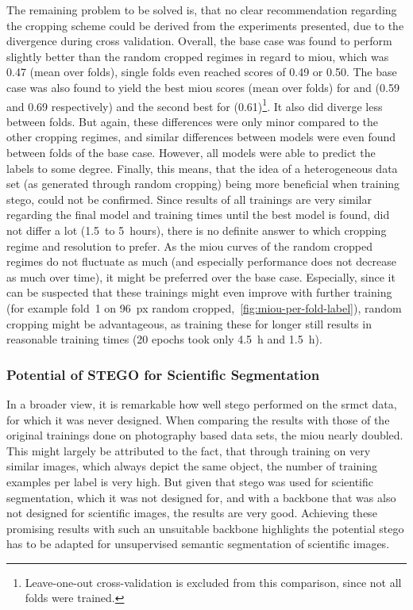 The remaining problem to be solved is, that no clear recommendation regarding the cropping scheme could be derived from the experiments presented, due to the divergence during cross validation.
Overall, the base case was found to perform slightly better than the random cropped regimes in regard to \gls{miou}, which was 0.47 (mean over folds), single folds even reached scores of 0.49 or 0.50.
The base case was also found to yield the best \gls{miou} scores (mean over folds) for  and  (0.59 and 0.69 respectively) and the second best for  (0.61)\footnote{Leave-one-out cross-validation is excluded from this comparison, since not all folds were trained.}.
It also did diverge less between folds.
But again, these differences were only minor compared to the other cropping regimes, and similar differences between models were even found between folds of the base case.
However, all models were able to predict the labels to some degree.
Finally, this means, that the idea of a heterogeneous data set (as generated through random cropping) being more beneficial when training \gls{stego}, could not be confirmed.
Since results of all trainings are very similar regarding the final model and training times until the best model is found, did not differ a lot (1.5~to 5~hours), there is no definite answer to which cropping regime and resolution to prefer.
As the \gls{miou} curves of the random cropped regimes do not fluctuate as much (and especially performance does not decrease as much over time), it might be preferred over the base case.
Especially, since it can be suspected that these trainings might even improve with further training (for example fold~1 on 96~px random cropped,~\autoref{fig:miou-per-fold-label}), random cropping might be advantageous, as training these for longer still results in reasonable training times (20 epochs took only 4.5~h and 1.5~h).


\subsubsection{Potential of STEGO for Scientific Segmentation}
In a broader view, it is remarkable how well \gls{stego} performed on the \gls{srmct} data, for which it was never designed.
When comparing the results with those of the original trainings done on photography based data sets, the \gls{miou} nearly doubled.
This might largely be attributed to the fact, that through training on very similar images, which always depict the same object, the number of training examples per label is very high.
But given that \gls{stego} was used for scientific segmentation, which it was not designed for, and with a backbone that was also not designed for scientific images, the results are very good.
Achieving these promising results with such an unsuitable backbone highlights the potential \gls{stego} has to be adapted for unsupervised semantic segmentation of scientific images.


